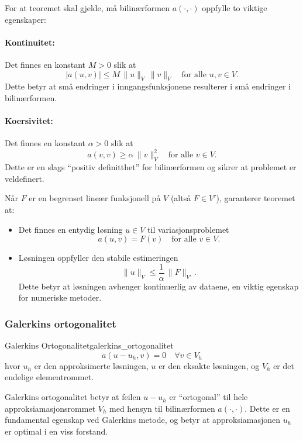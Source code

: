 For at teoremet skal gjelde, må bilinærformen $a(\cdot, \cdot)$ oppfylle to viktige egenskaper:

\paragraph{Kontinuitet:} Det finnes en konstant $M > 0$ slik at
\[
	|a(u,v)| \leq M\, \|u\|_V\, \|v\|_V \quad \text{for alle } u,v\in V.
\]
Dette betyr at små endringer i inngangsfunksjonene resulterer i små endringer i bilinærformen.

\paragraph{Koersivitet:} Det finnes en konstant $\alpha > 0$ slik at
\[
	a(v,v) \geq \alpha\, \|v\|_V^2 \quad \text{for alle } v\in V.
\]
Dette er en slags \enquote{positiv definitthet} for bilinærformen og sikrer at problemet er veldefinert.

Når $F$ er en begrenset lineær funksjonell på $V$ (altså $F \in V'$), garanterer teoremet at:
\begin{itemize}
	\item Det finnes en entydig løsning $u \in V$ til variasjonsproblemet
	      \[
		      a(u,v)=F(v) \quad \text{for alle } v\in V.
	      \]

	\item Løsningen oppfyller den stabile estimeringen
	      \[
		      \|u\|_V \leq \frac{1}{\alpha}\, \|F\|_{V'}.
	      \]
	      Dette betyr at løsningen avhenger kontinuerlig av dataene, en viktig egenskap for numeriske metoder.
\end{itemize}

\subsubsection{Galerkins ortogonalitet}

\begin{definition}{Galerkins Ortogonalitet}{galerkins_ortogonalitet}
	\[
		a(u - u_h, v) = 0 \quad \forall v \in V_h
	\]
	hvor $u_h$ er den approksimerte løsningen, $u$ er den eksakte løsningen, og $V_h$ er det endelige elementrommet.
\end{definition}

Galerkins ortogonalitet betyr at feilen $u - u_h$ er \enquote{ortogonal} til hele approksiamasjonsrommet $V_h$ med hensyn til bilinærformen $a(\cdot,\cdot)$. Dette er en fundamental egenskap ved Galerkins metode, og betyr at approksiamasjonen $u_h$ er optimal i en viss forstand.


